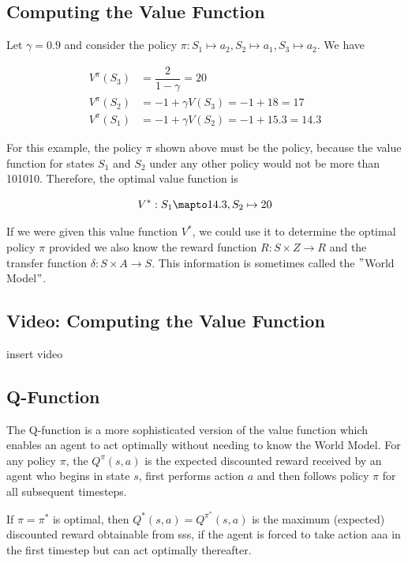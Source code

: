 \documentclass[11pt]{article}
\begin{document}
\subsection{Computing the Value Function}\label{subsec:computing-the-value-function}

Let $\gamma = 0.9$ and consider the policy $\pi : S_1 \mapsto a_2 , S_2 \mapsto a_1, S_3 \mapsto a_2$.
We have

\[
\begin{aligned}
V^{\pi} (S_3) &= \dfrac{2}{1 - \gamma} = 20 \\
V^{\pi}(S_2) &= -1 + \gamma V (S_3) = -1 + 18 = 17 \\
V^{\pi}(S_1) &= -1 + \gamma V (S_2) = -1 + 15.3 = 14.3
\end{aligned}
\]

For this example, the policy $\pi$ shown above must be the 
policy, because the value function for states $S_1$ and $S_2$ under any other
policy would not be more than 101010.
Therefore, the optimal value function is

\[V^* : S_1 \mapto 14.3, S_2 \mapsto 20\]

If we were given this value function $V^*$, we could use it to determine the
optimal policy $\pi$ provided we also know the reward function $R: S \times Z \to R$
and the transfer function $\delta : S \times A \to S$.
This information is sometimes called the \("\)World Model\("\).

\subsection{Video: Computing the Value Function}\label{subsec:video:-computing-the-value-function}
insert video

\subsection{Q-Function}\label{subsec:q-function}
The Q-function is a more sophisticated version of the value function which
enables an agent to act optimally without needing to know the World Model.
For any policy $\pi$, the  $Q^{\pi} (s,a)$ is the expected
discounted reward received by an agent who begins in state $s$, first performs
action $a$ and then follows policy $\pi$ for all subsequent timesteps.

If $\pi = \pi^*$ is optimal, then $Q^* (s,a) = Q^{\pi^*}(s,a)$ is the maximum
(expected) discounted reward obtainable from sss, if the agent is forced to
take action aaa in the first timestep but can act optimally thereafter.
\end{document}
